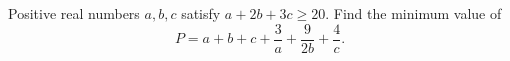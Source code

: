 Positive real numbers $a,b,c$ satisfy $a+2b+3c\ge20$. Find the minimum value of
\[
P=a+b+c+\dfrac{3}{a}+\dfrac{9}{2b}+\dfrac{4}{c}.
\]
